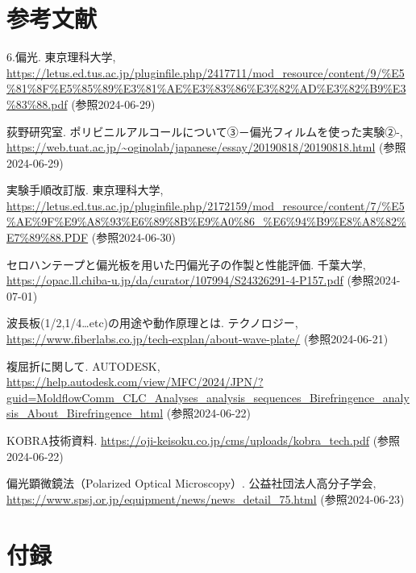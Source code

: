 \documentclass{article}
\begin{document}
\section*{参考文献}
\begin{spacing}{1.4}
    \noindent
    [1] 6.偏光. 
    東京理科大学, 
    \url{https://letus.ed.tus.ac.jp/pluginfile.php/2417711/mod_resource/content/9/%E5%81%8F%E5%85%89%E3%81%AE%E3%83%86%E3%82%AD%E3%82%B9%E3%83%88.pdf}
    (参照2024-06-29)

    \noindent
    [2] 荻野研究室. 
    ポリビニルアルコールについて③－偏光フィルムを使った実験②-, 
    \url{https://web.tuat.ac.jp/~oginolab/japanese/essay/20190818/20190818.html}
    (参照2024-06-29)

    \noindent
    [3] 実験手順改訂版. 
    東京理科大学, 
    \url{https://letus.ed.tus.ac.jp/pluginfile.php/2172159/mod_resource/content/7/%E5%AE%9F%E9%A8%93%E6%89%8B%E9%A0%86_%E6%94%B9%E8%A8%82%E7%89%88.PDF}
    (参照2024-06-30)

    \noindent
    [4] セロハンテープと偏光板を用いた円偏光子の作製と性能評価. 
    千葉大学, 
    \url{https://opac.ll.chiba-u.jp/da/curator/107994/S24326291-4-P157.pdf}
    (参照2024-07-01)

    \noindent
    [5] 波長板(1/2,1/4…etc)の用途や動作原理とは. 
    テクノロジー, 
    \url{https://www.fiberlabs.co.jp/tech-explan/about-wave-plate/}
    (参照2024-06-21)

    \noindent
    [6] 複屈折に関して. AUTODESK, 
    \url{https://help.autodesk.com/view/MFC/2024/JPN/?guid=MoldflowComm_CLC_Analyses_analysis_sequences_Birefringence_analysis_About_Birefringence_html}
    (参照2024-06-22)

    \noindent
    [7] KOBRA技術資料.
    \url{https://oji-keisoku.co.jp/cms/uploads/kobra_tech.pdf}
    (参照2024-06-22)

    \noindent
    [8] 偏光顕微鏡法（Polarized Optical Microscopy）. 公益社団法人高分子学会, 
    \url{https://www.spsj.or.jp/equipment/news/news_detail_75.html}
    (参照2024-06-23)
\end{spacing}

\newpage
\section*{付録}
\end{document}
